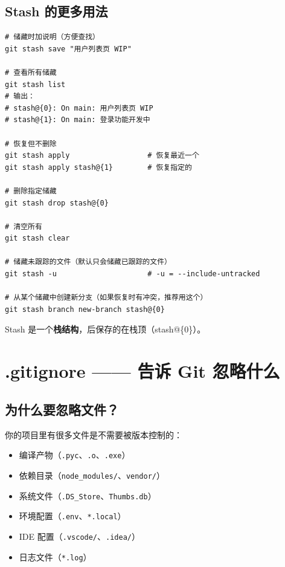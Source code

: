 \documentclass[12pt,a4paper]{article}
\begin{document}
\subsection{Stash 的更多用法}

\begin{lstlisting}
# 储藏时加说明（方便查找）
git stash save "用户列表页 WIP"

# 查看所有储藏
git stash list
# 输出：
# stash@{0}: On main: 用户列表页 WIP
# stash@{1}: On main: 登录功能开发中

# 恢复但不删除
git stash apply                  # 恢复最近一个
git stash apply stash@{1}        # 恢复指定的

# 删除指定储藏
git stash drop stash@{0}

# 清空所有
git stash clear

# 储藏未跟踪的文件（默认只会储藏已跟踪的文件）
git stash -u                     # -u = --include-untracked

# 从某个储藏中创建新分支（如果恢复时有冲突，推荐用这个）
git stash branch new-branch stash@{0}
\end{lstlisting}

Stash 是一个\textbf{栈结构}，后保存的在栈顶（stash@\{0\}）。

\section{.gitignore —— 告诉 Git 忽略什么}

\subsection{为什么要忽略文件？}

你的项目里有很多文件是不需要被版本控制的：
\begin{itemize}[itemsep=3pt]
    \item 编译产物（\texttt{.pyc}、\texttt{.o}、\texttt{.exe}）
    \item 依赖目录（\texttt{node\_modules/}、\texttt{vendor/}）
    \item 系统文件（\texttt{.DS\_Store}、\texttt{Thumbs.db}）
    \item 环境配置（\texttt{.env}、\texttt{*.local}）
    \item IDE 配置（\texttt{.vscode/}、\texttt{.idea/}）
    \item 日志文件（\texttt{*.log}）
\end{itemize}
\end{document}
